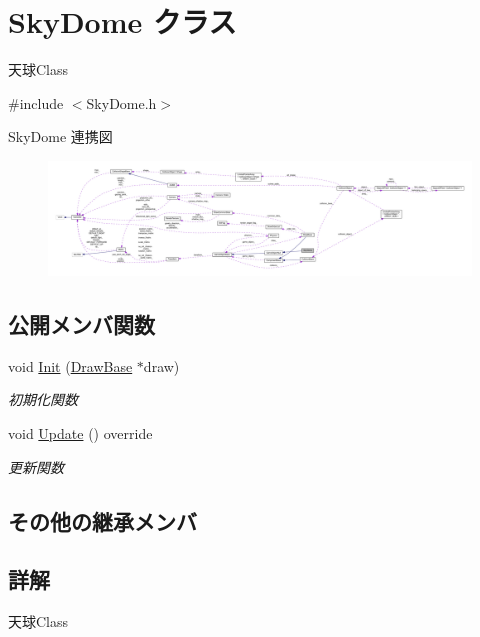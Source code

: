 \hypertarget{class_sky_dome}{}\section{Sky\+Dome クラス}
\label{class_sky_dome}


天球\+Class  




{\ttfamily \#include $<$Sky\+Dome.\+h$>$}



Sky\+Dome 連携図\nopagebreak
\begin{figure}[H]
\begin{center}
\leavevmode
\includegraphics[width=350pt]{class_sky_dome__coll__graph}
\end{center}
\end{figure}
\subsection*{公開メンバ関数}
\begin{DoxyCompactItemize}
\item 
void \mbox{\hyperlink{class_sky_dome_ac49a643482a76d1fb27be67a53245502}{Init}} (\mbox{\hyperlink{class_draw_base}{Draw\+Base}} $\ast$draw)
\begin{DoxyCompactList}\small\item\em 初期化関数 \end{DoxyCompactList}\item 
void \mbox{\hyperlink{class_sky_dome_ad9b9bfc252cbdc373dfca964430bdb89}{Update}} () override
\begin{DoxyCompactList}\small\item\em 更新関数 \end{DoxyCompactList}\end{DoxyCompactItemize}
\subsection*{その他の継承メンバ}


\subsection{詳解}
天球\+Class 

